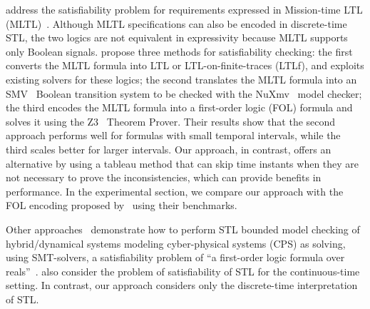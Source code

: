\documentclass[acmsmall,screen]{acmart}
\begin{document}
\citet{LiVR22} address the satisfiability problem for requirements expressed in Mission-time LTL (MLTL)~\cite{ReinbacherRS14}.
Although MLTL specifications can also be encoded in discrete-time STL, the two logics are not equivalent in expressivity because MLTL supports only Boolean signals.
\citet{LiVR22} propose three methods for satisfiability checking:
the first converts the MLTL formula into LTL or LTL-on-finite-traces (LTLf), and exploits existing solvers for these logics;
the second translates the MLTL formula into an SMV~\cite{0071856} Boolean transition system to be checked with the NuXmv~\cite{CavadaCDGMMMRT14} model checker;
the third encodes the MLTL formula into a first-order logic (FOL) formula and solves it using the Z3~\cite{Z3} Theorem Prover.
Their results show that the second approach performs well for formulas with small temporal intervals,
while the third scales better for larger intervals. 
%
 Our approach, in contrast, offers an alternative by using a tableau method that can skip time instants when they are not necessary to prove the inconsistencies, which can provide benefits in performance.
 In the experimental section, we compare our approach with the FOL encoding proposed by~\citet{LiVR22} using their benchmarks.  
 
 Other approaches~\cite{BaeLee19,LeeYB21,roehm} demonstrate how to perform STL bounded model checking of hybrid/dynamical systems modeling cyber-physical systems (CPS) as solving, using SMT-solvers, a satisfiability problem of ``a first-order logic formula over reals''~\cite{LeeYB21}.
 \citet{LeeYB21} also consider the problem of satisfiability of STL for the continuous-time setting.
 In contrast, our approach considers only the discrete-time interpretation of STL.
 

\end{document}
